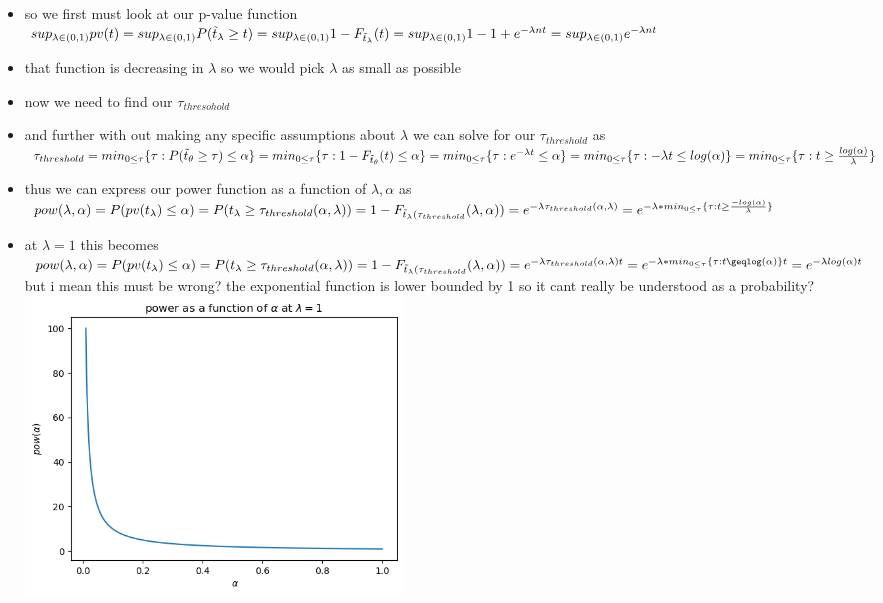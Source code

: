 \documentclass[12pt,twoside]{article}
\begin{document}
\begin{enumerate}
\begin{itemize}
\item so we first must look at our p-value function $sup_{\lambda\in (0,1)}pv(t)=sup_{\lambda\in (0,1)}P(\Tilde{t}_{\lambda}\geq t)=sup_{\lambda\in (0,1)}1-
F_{\Tilde{t}_{\lambda}}(t)=sup_{\lambda\in (0,1)}1-1+e^{-\lambda n t}=sup_{\lambda\in (0,1)}e^{-\lambda n t}$
\item that function is decreasing in $\lambda$ so we would pick $\lambda$ as small as possible
\item now we need to find our $\tau_{thresohold}$ 
\item and further with out making any specific assumptions about $\lambda$ we can solve for our $\tau_{threshold}$ as     $\tau_{threshold}=min_{0\leq \tau}\{\tau:P(\Tilde{t}_{\theta}\geq \tau)\leq \alpha\}=min_{0\leq \tau}\{\tau:1-F_{\Tilde{t}_{\theta}}(t)\leq \alpha\}=min_{0\leq \tau}\{\tau:e^{-\lambda t}\leq \alpha\}=min_{0\leq \tau}\{\tau:-\lambda t\leq log(\alpha)\}=min_{0\leq \tau}\{\tau:{t}\geq\frac{ log(\alpha)}{\lambda}\}$ 
    \item thus we can express our power function as a function of $\lambda, \alpha $ as $pow(\lambda, \alpha)=P(pv(t_{\lambda})\leq \alpha)=P(t_{\lambda}\geq \tau_{threshold}(\alpha, \lambda))=1-F_{\Tilde{t}_{\lambda}(\tau_{threshold}}(\lambda ,\alpha))= e^{-\lambda \tau_{threshold}(\alpha, \lambda)}=e^{-\lambda * min_{0\leq \tau}\{\tau:{t}\geq\frac{-log(\alpha)}{\lambda}\}}$
    \item at $\lambda=1$ this becomes $pow(\lambda, \alpha)=P(pv(t_{\lambda})\leq \alpha)=P(t_{\lambda}\geq \tau_{threshold}(\alpha, \lambda))=1-F_{\Tilde{t}_{\lambda}(\tau_{threshold}}(\lambda ,\alpha))= e^{-\lambda \tau_{threshold}(\alpha, \lambda)t}=e^{ -\lambda * min_{0\leq \tau}\{\tau:{t}\geqlog(\alpha)\}t}=e^{-\lambda log(\alpha) t}$ but i mean this must be wrong? the exponential function is lower bounded by 1 so it cant really be understood as a probability? 
    \\\includegraphics[width=10cm]{homework/homework_6/immages/question_2_1.png}

\end{itemize}
\end{enumerate}
\end{document}
